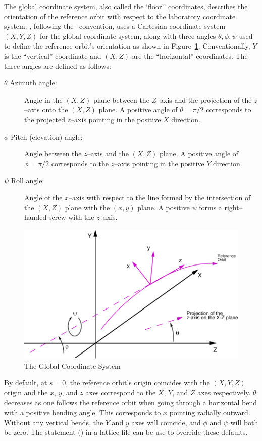 The global coordinate system, also called the `floor'' coordinates,
describes the orientation of the reference
orbit with respect to the laboratory coordinate system.  \bmad,
following the \mad\ convention, uses a Cartesian coordinate system
$(X, Y, Z)$ for the global coordinate system, along with three angles
$\theta, \phi, \psi$ used to define the reference orbit's orientation
as shown in Figure~\ref{f:global.coords}. Conventionally, $Y$ is the
``vertical'' coordinate and $(X, Z)$ are the ``horizontal'' coordinates.  
The three angles are defined as follows:
\begin{description}
\item[$\theta$ Azimuth angle:] Angle in the $(X, Z)$ plane 
between the $Z$--axis and the projection of the $z$--axis onto the
$(X, Z)$ plane. A positive angle of $\theta = \pi/2$ corresponds to the
projected $z$--axis pointing in the positive $X$ direction.
\item[$\phi$ Pitch (elevation) angle:] Angle between the $z$--axis 
and the $(X,Z)$ plane. A positive angle of $\phi = \pi/2$ corresponds to
the $z$--axis pointing in the positive $Y$ direction.
\item[$\psi$ Roll angle:] Angle of the $x$--axis with respect 
to the line formed by the
intersection of the $(X, Z)$ plane with the $(x, y)$ plane. A
positive $\psi$ forms a right--handed screw with the $z$--axis.
\end{description}

\begin{figure}
\centering
\includegraphics{global-coords.pdf}
\caption{The Global Coordinate System}
\label{f:global.coords}
\end{figure}

By default, at $s = 0$, the reference orbit's origin coincides with
the $(X, Y, Z)$ origin and the $x$, $y$, and $z$ axes correspond to
the $X$, $Y$, and $Z$ axes respectively. $\theta$ decreases as one
follows the reference orbit when going through a horizontal bend with
a positive bending angle. This corresponds to $x$ pointing radially
outward. Without any vertical bends, the $Y$ and $y$ axes will
coincide, and $\phi$ and $\psi$ will both be zero. The 
statement () in a lattice file can be use to
override these defaults.

